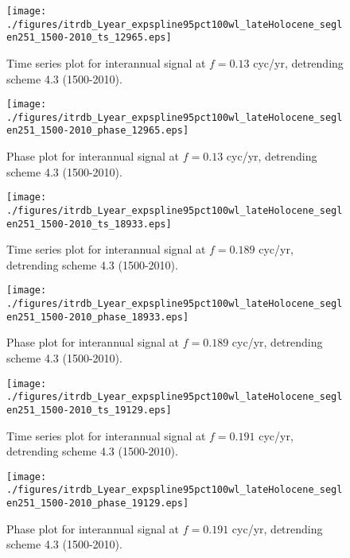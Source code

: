 \documentclass[phd,tocprelim]{cornell}
\begin{document}
\clearpage
\newpage

\begin{figure}[!tbp]
\centering
\begin{minipage}[b]{0.45\textwidth}
\texttt{[image: ./figures/itrdb\_Lyear\_expspline95pct100wl\_lateHolocene\_seglen251\_1500-2010\_ts\_12965.eps]}
\caption{Time series plot for interannual signal at $f=0.13$ cyc/yr, detrending scheme 4.3 (1500-2010).}
\label{ts4.3p1}
\end{minipage}
\hfill
\begin{minipage}[b]{0.45\textwidth}
\texttt{[image: ./figures/itrdb\_Lyear\_expspline95pct100wl\_lateHolocene\_seglen251\_1500-2010\_phase\_12965.eps]}
\caption{Phase plot for interannual signal at $f=0.13$ cyc/yr, detrending scheme 4.3 (1500-2010).}
\label{map4.3p1}
\end{minipage}
\end{figure}

\begin{figure}[!tbp]
\centering
\begin{minipage}[b]{0.45\textwidth}
\texttt{[image: ./figures/itrdb\_Lyear\_expspline95pct100wl\_lateHolocene\_seglen251\_1500-2010\_ts\_18933.eps]}
\caption{Time series plot for interannual signal at $f=0.189$ cyc/yr, detrending scheme 4.3 (1500-2010).}
\label{ts4.3p2}
\end{minipage}
\hfill
\begin{minipage}[b]{0.45\textwidth}
\texttt{[image: ./figures/itrdb\_Lyear\_expspline95pct100wl\_lateHolocene\_seglen251\_1500-2010\_phase\_18933.eps]}
\caption{Phase plot for interannual signal at $f=0.189$ cyc/yr, detrending scheme 4.3 (1500-2010).}
\label{map4.3p2}
\end{minipage}
\end{figure}

\begin{figure}[!tbp]
\centering
\begin{minipage}[b]{0.45\textwidth}
\texttt{[image: ./figures/itrdb\_Lyear\_expspline95pct100wl\_lateHolocene\_seglen251\_1500-2010\_ts\_19129.eps]}
\caption{Time series plot for interannual signal at $f=0.191$ cyc/yr, detrending scheme 4.3 (1500-2010).}
\label{ts4.3p3}
\end{minipage}
\hfill
\begin{minipage}[b]{0.45\textwidth}
\texttt{[image: ./figures/itrdb\_Lyear\_expspline95pct100wl\_lateHolocene\_seglen251\_1500-2010\_phase\_19129.eps]}
\caption{Phase plot for interannual signal at $f=0.191$ cyc/yr, detrending scheme 4.3 (1500-2010).}
\label{map4.3p3}
\end{minipage}
\end{figure}
\end{document}
